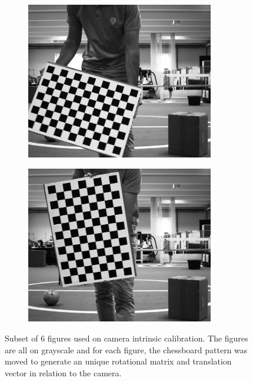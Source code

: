 \begin{figure}[h]
\begin{subfigure}[c]{0.30\textwidth}
		\includegraphics[width=0.9\textwidth]{img/camera-calibration/left-0044.png}
	\end{subfigure}
	\begin{subfigure}[c]{0.30\textwidth}
		\includegraphics[width=0.9\textwidth]{img/camera-calibration/left-0048.png}
	\end{subfigure}
	
	\caption{Subset of 6 figures used on camera intrinsic calibration. The figures are all on grayscale and for each figure, the chessboard pattern was moved to generate an unique rotational matrix and translation vector in relation to the camera.}
	\label{fig:camera-calibration-images}
\end{figure}

